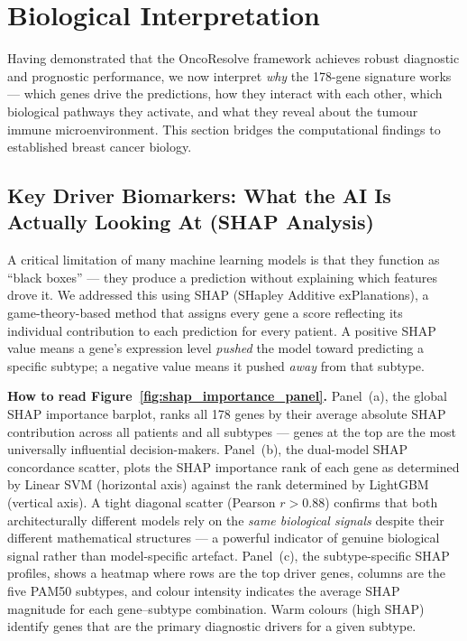 \documentclass[10pt,a4paper,twocolumn]{article}
\begin{document}
\section{Biological Interpretation}

Having demonstrated that the OncoResolve framework achieves robust diagnostic and prognostic performance, we now interpret \textit{why} the 178-gene signature works --- which genes drive the predictions, how they interact with each other, which biological pathways they activate, and what they reveal about the tumour immune microenvironment. This section bridges the computational findings to established breast cancer biology.

\subsection{Key Driver Biomarkers: What the AI Is Actually Looking At (SHAP Analysis)}

A critical limitation of many machine learning models is that they function as ``black boxes'' --- they produce a prediction without explaining which features drove it. We addressed this using SHAP (SHapley Additive exPlanations), a game-theory-based method that assigns every gene a score reflecting its individual contribution to each prediction for every patient. A positive SHAP value means a gene's expression level \textit{pushed} the model toward predicting a specific subtype; a negative value means it pushed \textit{away} from that subtype.

\textbf{How to read Figure~\ref{fig:shap_importance_panel}.} Panel~(a), the global SHAP importance barplot, ranks all 178 genes by their average absolute SHAP contribution across all patients and all subtypes --- genes at the top are the most universally influential decision-makers. Panel~(b), the dual-model SHAP concordance scatter, plots the SHAP importance rank of each gene as determined by Linear SVM (horizontal axis) against the rank determined by LightGBM (vertical axis). A tight diagonal scatter (Pearson $r > 0.88$) confirms that both architecturally different models rely on the \textit{same biological signals} despite their different mathematical structures --- a powerful indicator of genuine biological signal rather than model-specific artefact. Panel~(c), the subtype-specific SHAP profiles, shows a heatmap where rows are the top driver genes, columns are the five PAM50 subtypes, and colour intensity indicates the average SHAP magnitude for each gene--subtype combination. Warm colours (high SHAP) identify genes that are the primary diagnostic drivers for a given subtype.
\end{document}
